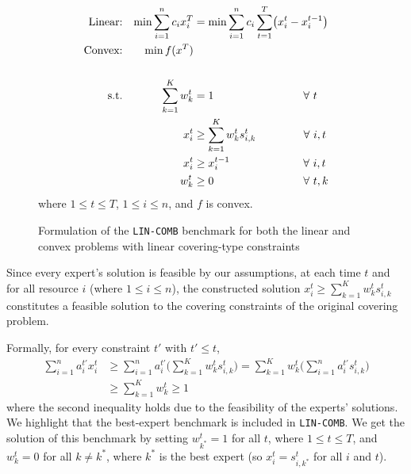 \begin{figure}[ht]
	\begin{mdframed}
		\vspace{-5pt}
		\begin{align*}
			\text{Linear:} && \min \sum_{i=1}^{n} c_{i} x_{i}^{T} &= \min \sum_{i=1}^{n} c_{i} \sum_{t=1}^{T} \bigl( x_{i}^{t} - x_{i}^{t-1}\bigr)\\
			\text{Convex:} && \min f(x^{T})\\
		&& & \\
		\text{s.t.} &&
			\sum_{k=1}^{K} w_{k}^{t} &= 1  \hspace{2.85cm} \forall\ t \\
			&& x_{i}^{t} &\geq \sum_{k=1}^{K} w_{k}^{t} s_{i,k}^{t} \hspace{1.518cm}  \forall\ i, t\\
			&& x_{i}^{t} &\geq x_{i}^{t-1} \hspace{2.338cm} \forall\ i, t\\
			&& w_{k}^{t} &\geq 0  \hspace{2.85cm} \forall\ t, k
		\end{align*}
		where $1 \leq t \leq T$, $1 \leq i \leq n$, and $f$ is convex.
		\vspace{5pt}
	\end{mdframed}
	\caption{Formulation of the \texttt{LIN-COMB} benchmark for both the linear and convex problems with linear covering-type constraints}
	\label{fig:benchmark}
	\end{figure}

Since every expert's solution is feasible by our assumptions, at each time $t$ and for all resource $i$ (where $1 \leq i \leq n$),
the constructed solution $x_{i}^{t} \geq \sum_{k=1}^{K} w_{k}^{t} s_{i,k}^{t}$ constitutes a feasible solution to the covering constraints of the original covering problem.

\noindent Formally, for every constraint $t'$ with $t' \leq t$,
%
\begin{align*}
	\sum_{i=1}^{n} a_{i}^{t'} x_{i}^{t} &\geq
	\sum_{i=1}^{n} a_{i}^{t'} \biggl( \sum_{k=1}^{K} w_{k}^{t} s_{i,k}^{t} \biggr)
	= \sum_{k=1}^{K} w_{k}^{t}  \biggl( \sum_{i=1}^{n} a_{i}^{t'} s_{i,k}^{t} \biggr)\\
	& \geq \sum_{k=1}^{K} w_{k}^{t} \geq 1
\end{align*}
%
where the second inequality holds due to the feasibility of the experts' solutions.
%
We highlight that the best-expert benchmark is included in \texttt{LIN-COMB}. We get the solution of this benchmark by setting $w^{t}_{k^{*}} = 1$ for all $t$, where $1 \leq t \leq T$, and $w^{t}_{k} = 0$ for all $k \neq k^{*}$,
where $k^{*}$ is the best expert (so $x_{i}^{t} = s_{i,k^{*}}^{t}$ for all $i$ and $t$).

